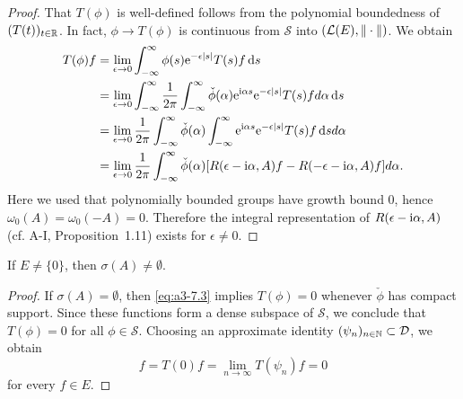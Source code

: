 \begin{proof}
That $T(\phi)$ is well-defined follows from the polynomial boundedness of $(T(t))_{t\in\mathbb{R}}$.
In fact, $\phi \to T(\phi)$ is continuous from $\mathcal{S}$ into $(\mathcal{L}(E),\|\cdot\|)$.
We obtain
\begin{align*}
T(\phi)f &= \lim_{\epsilon\to 0} \int_{-\infty}^{\infty} \phi(s)\mathrm{e}^{-\epsilon|s|}T(s)f \mathop{}\!\mathrm{d}{s} \\
&= \lim_{\epsilon\to 0} \int_{-\infty}^{\infty} \frac{1}{2\pi}\int_{-\infty}^{\infty} \check{\phi}(\alpha)\mathrm{e}^{\mathrm{i}\alpha s}\mathrm{e}^{-\epsilon|s|}T(s)f d\alpha \mathop{}\!\mathrm{d}{s} \\
&= \lim_{\epsilon\to 0} \frac{1}{2\pi}\int_{-\infty}^{\infty} \check{\phi}(\alpha)\int_{-\infty}^{\infty} \mathrm{e}^{\mathrm{i}\alpha s}\mathrm{e}^{-\epsilon|s|}T(s)f \mathop{}\!\mathrm{d}{s} d\alpha \\
&= \lim_{\epsilon\to 0} \frac{1}{2\pi}\int_{-\infty}^{\infty} \check{\phi}(\alpha)[R(\epsilon-\mathrm{i}\alpha,A)f - R(-\epsilon-\mathrm{i}\alpha,A)f] d\alpha  .
\end{align*}
Here we used that polynomially bounded groups have growth bound $0$, hence $\omega_{0}(A) = \omega_{0}(-A) = 0$.
Therefore the integral representation of $R(\epsilon-\mathrm{i}\alpha,A)$ (cf. A-I, Proposition~1.11) exists for $\epsilon \neq 0$.
\end{proof}
\begin{lemma}\label{lem:a3-7.6}
If $E \neq \{0\}$, then $\sigma(A) \neq \emptyset$.
\end{lemma}
\begin{proof}
If $\sigma(A) = \emptyset$, then \eqref{eq:a3-7.3} implies $T(\phi) = 0$ whenever $\check{\phi}$ has compact support.
Since these functions form a dense subspace of $\mathcal{S}$, we conclude that $T(\phi) = 0$ for all $\phi \in \mathcal{S}$.
Choosing an approximate identity $(\psi_{n})_{n\in\mathbb{N}} \subset \mathcal{D}$, we obtain
\[
f = T(0)f = \lim_{n\to\infty} T(\psi_{n})f = 0
\]
for every $f \in E$.
\end{proof}
